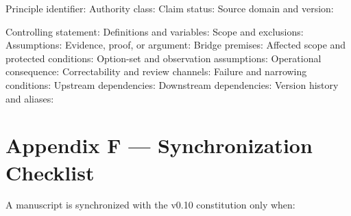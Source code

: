 \documentclass[
  11pt,
]{article}
\newenvironment{Shaded}{}{}
\newcommand{\NormalTok}[1]{#1}
\begin{document}
\begin{Shaded}
\begin{Highlighting}[]
\NormalTok{Principle identifier:}
\NormalTok{Authority class:}
\NormalTok{Claim status:}
\NormalTok{Source domain and version:}

\NormalTok{Controlling statement:}
\NormalTok{Definitions and variables:}
\NormalTok{Scope and exclusions:}
\NormalTok{Assumptions:}
\NormalTok{Evidence, proof, or argument:}
\NormalTok{Bridge premises:}
\NormalTok{Affected scope and protected conditions:}
\NormalTok{Option{-}set and observation assumptions:}
\NormalTok{Operational consequence:}
\NormalTok{Correctability and review channels:}
\NormalTok{Failure and narrowing conditions:}
\NormalTok{Upstream dependencies:}
\NormalTok{Downstream dependencies:}
\NormalTok{Version history and aliases:}
\end{Highlighting}
\end{Shaded}

\section{Appendix F --- Synchronization
Checklist}\label{appendix-f-synchronization-checklist}

A manuscript is synchronized with the v0.10 constitution only when:
\end{document}
